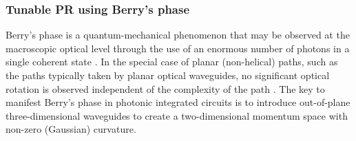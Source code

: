 \documentclass[../report.tex]{subfiles}
\begin{document}
\begin{itemize}[leftmargin=*]
		\subsubsection{Tunable PR using Berry's phase}Berry’s phase is a quantum-mechanical phenomenon that may be observed at the macroscopic optical level through the use of an enormous number of photons in a single coherent state \cite{chiao_manifestations_1986}. In the special case of planar (non-helical) paths, such as the paths typically taken by planar optical waveguides, no significant optical rotation is observed independent of the complexity of the path \cite{tomita_observation_1986}. The key to manifest Berry’s phase in photonic integrated circuits is to introduce out-of-plane three-dimensional waveguides to create a two-dimensional momentum space with non-zero (Gaussian) curvature.
		
	\end{itemize}
	
\end{document}
